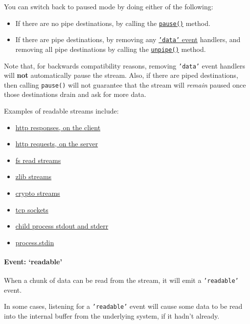 You can switch back to paused mode by doing either of the following:

\begin{itemize}
\item
  If there are no pipe destinations, by calling the
  \hyperref[stream\_readable\_pause]{\texttt{pause()}} method.
\item
  If there are pipe destinations, by removing any
  \hyperref[stream\_event\_data]{\texttt{'data'} event} handlers, and
  removing all pipe destinations by calling the
  \hyperref[stream\_readable\_unpipe\_destination]{\texttt{unpipe()}}
  method.
\end{itemize}

Note that, for backwards compatibility reasons, removing \texttt{'data'}
event handlers will \textbf{not} automatically pause the stream. Also,
if there are piped destinations, then calling \texttt{pause()} will not
guarantee that the stream will \emph{remain} paused once those
destinations drain and ask for more data.

Examples of readable streams include:

\begin{itemize}
\item
  \href{http.html\#http\_http\_incomingmessage}{http responses, on the
  client}
\item
  \href{http.html\#http\_http\_incomingmessage}{http requests, on the
  server}
\item
  \href{fs.html\#fs\_class\_fs\_readstream}{fs read streams}
\item
  \href{zlib.html}{zlib streams}
\item
  \href{crypto.html}{crypto streams}
\item
  \href{net.html\#net\_class\_net\_socket}{tcp sockets}
\item
  \href{child\_process.html\#child\_process\_child\_stdout}{child
  process stdout and stderr}
\item
  \href{process.html\#process\_process\_stdin}{process.stdin}
\end{itemize}

\paragraph{Event: `readable'}

When a chunk of data can be read from the stream, it will emit a
\texttt{'readable'} event.

In some cases, listening for a \texttt{'readable'} event will cause some
data to be read into the internal buffer from the underlying system, if
it hadn't already.

